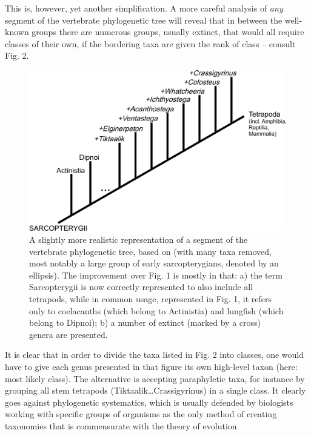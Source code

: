 \begin{artengenv}
This is, however, yet another simplification. A more careful analysis of \textit{any }segment of the vertebrate
phylogenetic tree will reveal that in between the well-known groups there are numerous groups, usually extinct, that
would all require classes of their own, if the bordering taxa are given the rank of class -- consult Fig. 2.

\begin{figure}[h]
	\centering
	\includegraphics[width=1\textwidth]{PAU_Lamza/Lamzaorg-img002.jpg}
	\caption{A slightly more realistic representation of a segment of the vertebrate phylogenetic tree, based on
		\parencite{swartz_marine_2012}
		(with many taxa removed, most notably a large group of early sarcopterygians,
		denoted by an ellipsis). The improvement over Fig. 1 is mostly in that: a) the term Sarcopterygii is now correctly
		represented to also include all tetrapods, while in common usage, represented in Fig. 1, it refers only to coelacanths
		(which belong to Actinistia) and lungfish (which belong to Dipnoi); b) a number of extinct (marked by a cross) genera
		are presented.}
\end{figure}

It is clear that in order to divide the taxa listed in Fig. 2 into classes, one would have to give each genus presented
in that figure its own high-level taxon (here: most likely class). The alternative is accepting paraphyletic taxa, for
instance by grouping all stem tetrapods (Tiktaalik\ldots Crassigyrinus) in a single class. It clearly goes against
phylogenetic systematics, which is usually defended by biologists working with specific groups of organisms as the only
method of creating taxonomies that is commensurate with the theory of evolution
\parencite[see e.g.][]{williams_pursuit_2007}


\end{artengenv}
